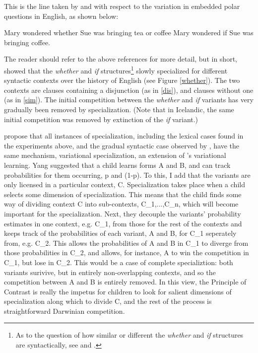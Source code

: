 \documentclass{artikel3}
\begin{document}
This is the line taken by \citet{baileywallenbergwurff2012} and \citet{fruehwaldwallenberg2013} with respect to the variation in embedded polar questions in English, as shown below:

\begin{exe}
    \ex \label{dis} Mary wondered whether Sue was bringing tea or coffee
    \ex \label{sim} Mary wondered if Sue was bringing coffee.
\end{exe}

\noindent The reader should refer to the above references for more detail, but in short, \citet{baileywallenbergwurff2012} showed that the \textsl{whether} and \textsl{if} structures\footnote{As to the question of how similar or different the \textsl{whether} and \textsl{if} structures are syntactically, see \citet{larson1985} and \citet{hanromero2004}.} slowly specialized for different syntactic contexts over the history of English (see Figure \ref{whether}). The two contexts are clauses containing a disjunction (as in \ref{dis}), and clauses without one (as in \ref{sim}). The initial competition between the \textsl{whether} and \textsl{if} variants has very gradually been removed by specialization. (Note that in Icelandic, the same initial competition was removed by extinction of the \textsl{if} variant.)

\citet{fruehwaldwallenberg2013} propose that all instances of specialization, including the lexical cases found in the experiments above, and the gradual syntactic case observed by \citet{baileywallenbergwurff2012}, have the same mechanism, variational specialization, an extension of \citet{yang2000, yang2002}'s variational learning. Yang suggested that a child learns forms A and B, and can track probabilities for them occurring, p and (1-p). To this, I add that the variants are only licensed in a particular context, C. Specialization takes place when a child selects some dimension of specialization. This means that the child finds some way of dividing context C into sub-contexts, C_1,...,C_n, which will become important for the specialization. Next, they decouple the variants’ probability estimates in one context, e.g. C_1, from those for the rest of the contexts and keeps track of the probabilities of each variant, A and B, for C_1 seperately from, e.g. C_2. This allows the probabilities of A and B in C_1 to diverge from those probabilities in C_2, and allows, for instance, A to win the competition in C_1, but lose in C_2. This would be a case of complete specializtion: both variants surivive, but in entirely non-overlapping contexts, and so the competition between A and B is entirely removed. In this view, the Principle of Contrast is really the impetus for children to look for salient dimensions of specialization along which to divide C, and the rest of the process is straightforward Darwinian competition.
\end{document}
